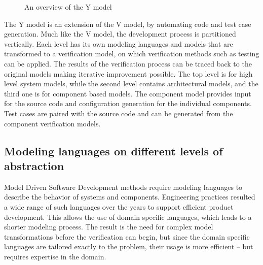 \begin{figure}
	\caption{An overview of the Y model}
	\label{fig:intro:ymodel}
\end{figure}

The Y model\citep{ymodel} is an extension of the V model\citep{randomwikipedialink3}, by automating code and test case generation. Much like the V model, the development process is partitioned vertically. Each level has its own modeling languages and models that are transformed to a verification model, on which verification methods such as testing can be applied. The results of the verification process can be traced back to the original models making iterative improvement possible. The top level is for high level system models, while the second level contains architectural models, and the third one is for component based models. The component model provides input for the source code and configuration generation for the individual components. Test cases are paired with the source code and can be generated from the component verification models.


\subsection{Modeling languages on different levels of abstraction}

Model Driven Software Development methods require modeling languages to describe the behavior of systems and components. Engineering practices resulted a wide range of such languages over the years to support efficient product development. This allows the use of domain specific languages, which leads to a shorter modeling process. The result is the need for complex model transformations before the verification can begin,
but since the domain specific languages are tailored exactly to the problem, their usage is more efficient -- but requires expertise in the domain.  

